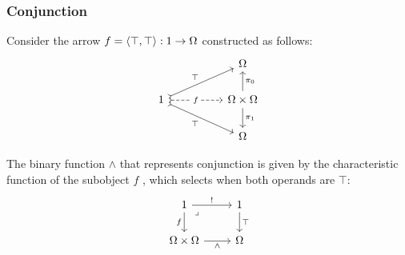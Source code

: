 \subsubsection{Conjunction}

\begin{definition}[Conjunction]
  Consider the arrow $f = \langle\top,\top\rangle: 1\to \Omega$ constructed as follows:
  \[\begin{tikzcd}[ampersand replacement=\&]
    \&\& \Omega \\
    1 \&\& \Omega\times\Omega \\
    \&\& \Omega
    \arrow["{\pi_0}"', from=2-3, to=1-3]
    \arrow["{\pi_1}", from=2-3, to=3-3]
    \arrow["\top", tail, from=2-1, to=1-3]
    \arrow["\top"', tail, from=2-1, to=3-3]
    \arrow["f"{description}, dashed, tail, from=2-1, to=2-3]
  \end{tikzcd}\]

  The binary function $\land$ that represents conjunction is given by the
  characteristic function of the subobject $f$
  \parencite[p.~137]{goldblatt:topoi}, which selects when both operands are
  $\top$:
  \[\begin{tikzcd}[ampersand replacement=\&]
    1 \& 1 \\
    {\Omega\times \Omega} \& \Omega
    \arrow["\top", from=1-2, to=2-2]
    \arrow["f"', from=1-1, to=2-1]
    \arrow["\land"', from=2-1, to=2-2]
    \arrow["{!}", from=1-1, to=1-2]
    \arrow["\lrcorner"{anchor=center, pos=0.125}, draw=none, from=1-1, to=2-2]
  \end{tikzcd}\]
\end{definition}

